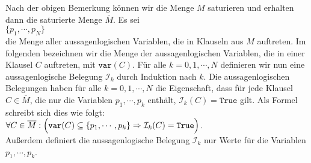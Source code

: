 Nach der obigen Bemerkung können wir die Menge $M$ saturieren und erhalten dann die satu\-rierte Menge
$\overline{M}$.  Es sei  
\\[0.2cm]
\hspace*{1.3cm}
$\{ p_1, \cdots, p_N \}$
\\[0.2cm]
die Menge aller aussagenlogischen Variablen, die in Klauseln aus $M$ auftreten.  Im folgenden be\-zeichnen wir
die Menge der aussagenlogischen Variablen, die in einer Klausel $C$ auftreten, mit $\mathtt{var}(C)$.
Für alle $k=0,1,\cdots,N$
definieren wir nun eine aussagenlogische Belegung $\mathcal{I}_k$ durch Induktion nach $k$.  Die
aussagenlogischen Belegungen haben für alle $k=0,1,\cdots,N$ die Eigenschaft, dass für jede Klausel $C \in \overline{M}$,
die nur die Variablen $p_1,\cdots,p_k$ enthält,
$\mathcal{I}_k(C) = \mathtt{True}$ gilt.  Als Formel schreibt sich dies wie folgt:
\\[0.2cm]
\hspace*{1.3cm}
$\forall C \in \overline{M}:\Bigl(\mathtt{var}(C) \subseteq \{p_1, \cdots, p_k\} \Rightarrow \mathcal{I}_k(C) = \mathtt{True}\Bigl)$.
\\[0.2cm]
Außerdem definiert die aussagenlogische Belegung $\mathcal{I}_k$ nur Werte für die Variablen
$p_1,\cdots,p_k$.
